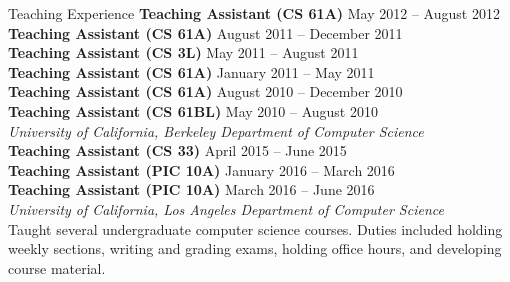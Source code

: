 \documentclass{resume}
\begin{document}
\vspace{-1.5em}

\begin{component}{Teaching Experience}
    \textbf{Teaching Assistant (CS 61A)} \hfill May 2012 -- August 2012 \\
    \textbf{Teaching Assistant (CS 61A)} \hfill August 2011 -- December 2011 \\
    \textbf{Teaching Assistant (CS 3L)} \hfill May 2011 -- August 2011 \\
    \textbf{Teaching Assistant (CS 61A)} \hfill January 2011 -- May 2011 \\
    \textbf{Teaching Assistant (CS 61A)} \hfill August 2010 -- December 2010 \\
    \textbf{Teaching Assistant (CS 61BL)} \hfill May 2010 -- August 2010 \\
        \textit{University of California, Berkeley \hfill Department of Computer Science}\\
    \textbf{Teaching Assistant (CS 33)} \hfill April 2015 -- June 2015 \\
    \textbf{Teaching Assistant (PIC 10A)} \hfill January 2016 -- March 2016 \\
    \textbf{Teaching Assistant (PIC 10A)} \hfill March 2016 -- June 2016 \\
        \textit{University of California, Los Angeles \hfill Department of Computer Science}\\
    Taught several undergraduate computer science courses. Duties included holding weekly sections, writing and grading exams, holding office hours, and developing course material.
\end{component}

\vspace{0.5em}
\end{document}
